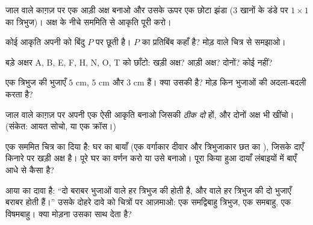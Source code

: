 \begin{exercise}[$\star$]\label{exo:g4:symmetry:5}
जाल वाले काग़ज़ पर एक आड़ी अक्ष बनाओ और उसके ऊपर एक छोटा झंडा
($3$ खानों के डंडे पर $1 \times 1$ का त्रिभुज)। अक्ष के नीचे
सममिति से आकृति पूरी करो।
\end{exercise}

\begin{exercise}[$\star$]\label{exo:g4:symmetry:6}
कोई आकृति अपनी  को बिंदु $P$ पर छूती है। $P$ का
प्रतिबिंब कहाँ है? मोड़ वाले चित्र से समझाओ।
\end{exercise}

\begin{exercise}[$\star$]\label{exo:g4:symmetry:7}
बड़े अक्षर A, B, E, F, H, N, O, T को छाँटो: खड़ी अक्ष?
आड़ी अक्ष? दोनों? कोई नहीं?
\end{exercise}

\begin{exercise}[$\star$]\label{exo:g4:symmetry:8}
एक त्रिभुज की भुजाएँ $5$ cm, $5$ cm और $3$ cm हैं। क्या उसकी
 है? मोड़ किन भुजाओं की अदला-बदली करता है?
\end{exercise}

\begin{exercise}[$\star\star$]\label{exo:g4:symmetry:9}
जाल वाले काग़ज़ पर अपनी एक ऐसी आकृति बनाओ जिसकी \emph{ठीक दो}
 हों, और दोनों अक्ष भी खींचो। (संकेत: आयत सोचो,
या एक क्रॉस।)
\end{exercise}

\begin{exercise}[$\star\star$]\label{exo:g4:symmetry:10}
एक सममित चित्र का  दिया है: घर का बायाँ  (एक वर्गाकार
दीवार और त्रिभुजाकार छत का ), जिसके दाएँ किनारे पर खड़ी अक्ष
है। पूरे घर का वर्णन करो या उसे बनाओ। पूरा किया हुआ दायाँ 
लंबाइयों में बाएँ आधे से कैसा है?
\end{exercise}

\begin{exercise}[$\star\star$]\label{exo:g4:symmetry:11}
आया का दावा है: ``दो बराबर भुजाओं वाले हर त्रिभुज की 
होती है, और  वाले हर त्रिभुज की दो भुजाएँ बराबर
होती हैं।'' उसके दोहरे दावे को चित्रों पर आज़माओ: एक समद्विबाहु
त्रिभुज, एक समबाहु, एक विषमबाहु। क्या मोड़ना उसका साथ देता है?
\end{exercise}
